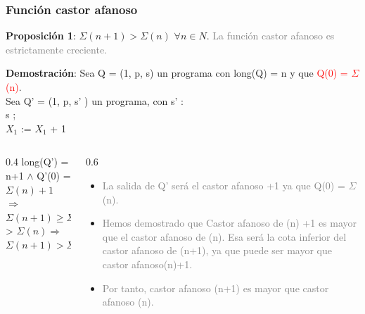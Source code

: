 \documentclass[xcolor=table]{beamer}
\begin{document}
\begin{frame}[fragile]\frametitle{Función castor afanoso} \scriptsize

\textbf{Proposición 1}: $\Sigma(n+1) > \Sigma (n)$ $\forall n \in N$. \textcolor{gray}{La función castor afanoso es estrictamente creciente.}

\hspace{1cm}

\textbf{Demostración}:
Sea Q = (1, p, s) un programa con long(Q) = n y que \textcolor{red}{Q(0) = $\Sigma$ (n)}.\\

Sea Q' = (1, p, s' ) un programa, con s' :\\
s ;\\
$X_1$ := $X_1$ + 1\\


\begin{columns}
    \begin{column}{0.4\textwidth}
    long(Q') = n+1 $\wedge$ Q'(0) = $\Sigma(n)+1$ $\Rightarrow$\\
    $\Sigma(n+1) \geq  \Sigma(n)+1$  > $\Sigma(n)  \Rightarrow$\\
    $\Sigma(n+1) > \Sigma(n)$\\
    \end{column}
    \begin{column}{0.6\textwidth}
    
        \begin{itemize}
            \item \textcolor{gray}{La salida de Q' será el castor afanoso +1 ya que Q(0) = $\Sigma$ (n).}
            \item \textcolor{gray}{Hemos demostrado que Castor afanoso de (n) +1 es mayor que el castor afanoso de (n). Esa será la cota inferior del castor afanoso de (n+1), ya que puede ser mayor que castor afanoso(n)+1.}
            \item \textcolor{gray}{Por tanto, castor afanoso (n+1) es mayor que castor afanoso (n).}
        \end{itemize}
    \end{column}
\end{columns}\break




\end{frame}
\end{document}
